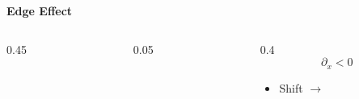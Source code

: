 \documentclass[
 ]{beamer}%
\begin{document}
\begin{frame}
    \textbf{Edge Effect}
    \begin{columns}
        \begin{column}{0.45\textwidth}
            \edgeeffect

            \edgeillumination
        \end{column}
        \begin{column}{0.05\textwidth}
            
        \end{column}
        \begin{column}{0.4\textwidth}
            \vspace{-1cm}
            \begin{equation*}
                \partial_x<0
            \end{equation*}
            \begin{itemize}
                \vspace{-0.65cm}
                \centering
                \item Shift $\rightarrow$
            \end{itemize}
            

\end{column}
\end{columns}
\end{frame}
\end{document}
